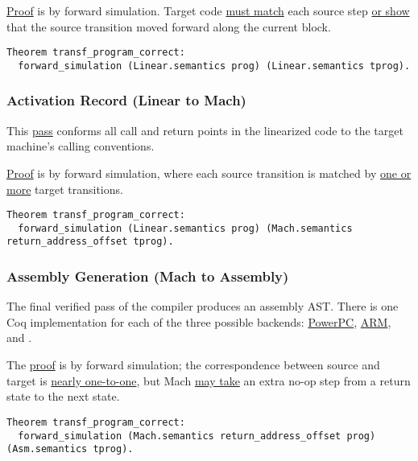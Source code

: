 \href{https://github.com/AbsInt/CompCert/blob/master/backend/CleanupLabelsproof.v#L366}{Proof} is by forward simulation.
Target code \href{https://github.com/AbsInt/CompCert/blob/master/backend/CleanupLabelsproof.v#L252}{must match} each source step \href{https://github.com/AbsInt/CompCert/blob/master/backend/CleanupLabelsproof.v#L235}{or show} that the source transition moved forward along the current block.
\begin{lstlisting}[style=Coq]
Theorem transf_program_correct:
  forward_simulation (Linear.semantics prog) (Linear.semantics tprog).
\end{lstlisting}


\subsubsection{Activation Record (Linear to Mach)}
This \href{https://github.com/AbsInt/CompCert/blob/master/backend/Stacking.v}{pass} conforms all call and return points in the linearized code to the target machine's calling conventions.

\href{https://github.com/AbsInt/CompCert/blob/master/backend/Stackingproof.v#L2923}{Proof} is by forward simulation, where each source transition is matched by \href{https://github.com/AbsInt/CompCert/blob/master/backend/Stackingproof.v#L2539}{one or more} target transitions.
\begin{lstlisting}[style=Coq]
Theorem transf_program_correct:
  forward_simulation (Linear.semantics prog) (Mach.semantics return_address_offset tprog).
\end{lstlisting}


\subsubsection{Assembly Generation (Mach to Assembly)}
The final verified pass of the compiler produces an assembly AST.
There is one Coq implementation for each of the three possible backends: \href{https://github.com/AbsInt/CompCert/blob/master/powerpc/Asmgen.v}{PowerPC}, \href{https://github.com/AbsInt/CompCert/blob/master/arm/Asmgen.v}{ARM}, and \href{https://github.com/AbsInt/CompCert/blob/master/ia32/Asmgen.v}{\intel}.

The \href{https://github.com/AbsInt/CompCert/blob/master/ia32/Asmgenproof.v#L910}{proof} is by forward simulation; the correspondence between source and target is \href{https://github.com/AbsInt/CompCert/blob/master/ia32/Asmgenproof.v#L481}{nearly one-to-one}, but Mach \href{https://github.com/AbsInt/CompCert/blob/master/ia32/Asmgenproof.v#L472}{may take} an extra no-op step from a return state to the next state.
\begin{lstlisting}[style=Coq]
Theorem transf_program_correct:
  forward_simulation (Mach.semantics return_address_offset prog) (Asm.semantics tprog).
\end{lstlisting}


